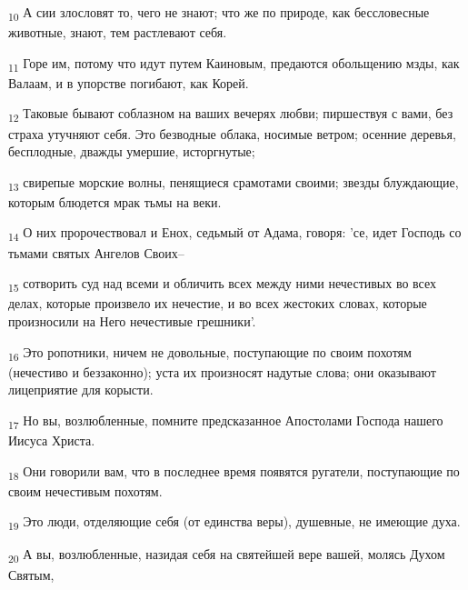 \begin{tcolorbox}
\textsubscript{10} А сии злословят то, чего не знают; что же по природе, как бессловесные животные, знают, тем растлевают себя.
\end{tcolorbox}
\begin{tcolorbox}
\textsubscript{11} Горе им, потому что идут путем Каиновым, предаются обольщению мзды, как Валаам, и в упорстве погибают, как Корей.
\end{tcolorbox}
\begin{tcolorbox}
\textsubscript{12} Таковые бывают соблазном на ваших вечерях любви; пиршествуя с вами, без страха утучняют себя. Это безводные облака, носимые ветром; осенние деревья, бесплодные, дважды умершие, исторгнутые;
\end{tcolorbox}
\begin{tcolorbox}
\textsubscript{13} свирепые морские волны, пенящиеся срамотами своими; звезды блуждающие, которым блюдется мрак тьмы на веки.
\end{tcolorbox}
\begin{tcolorbox}
\textsubscript{14} О них пророчествовал и Енох, седьмый от Адама, говоря: 'се, идет Господь со тьмами святых Ангелов Своих--
\end{tcolorbox}
\begin{tcolorbox}
\textsubscript{15} сотворить суд над всеми и обличить всех между ними нечестивых во всех делах, которые произвело их нечестие, и во всех жестоких словах, которые произносили на Него нечестивые грешники'.
\end{tcolorbox}
\begin{tcolorbox}
\textsubscript{16} Это ропотники, ничем не довольные, поступающие по своим похотям (нечестиво и беззаконно); уста их произносят надутые слова; они оказывают лицеприятие для корысти.
\end{tcolorbox}
\begin{tcolorbox}
\textsubscript{17} Но вы, возлюбленные, помните предсказанное Апостолами Господа нашего Иисуса Христа.
\end{tcolorbox}
\begin{tcolorbox}
\textsubscript{18} Они говорили вам, что в последнее время появятся ругатели, поступающие по своим нечестивым похотям.
\end{tcolorbox}
\begin{tcolorbox}
\textsubscript{19} Это люди, отделяющие себя (от единства веры), душевные, не имеющие духа.
\end{tcolorbox}
\begin{tcolorbox}
\textsubscript{20} А вы, возлюбленные, назидая себя на святейшей вере вашей, молясь Духом Святым,
\end{tcolorbox}
